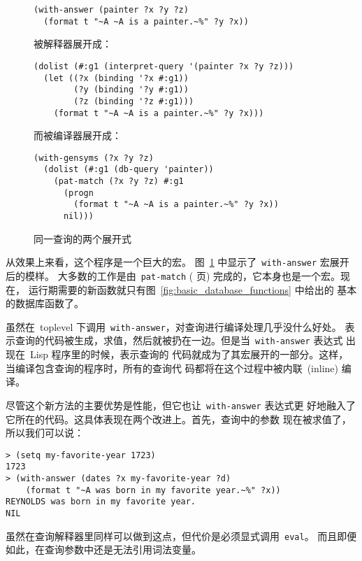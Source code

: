 \begin{figure}
\begin{lstlisting}
(with-answer (painter ?x ?y ?z)
  (format t "~A ~A is a painter.~%" ?y ?x))
\end{lstlisting}
被解释器展开成：
\begin{lstlisting}
(dolist (#:g1 (interpret-query '(painter ?x ?y ?z)))
  (let ((?x (binding '?x #:g1))
        (?y (binding '?y #:g1))
        (?z (binding '?z #:g1)))
    (format t "~A ~A is a painter.~%" ?y ?x)))
\end{lstlisting}
而被编译器展开成：
\begin{lstlisting}
(with-gensyms (?x ?y ?z)
  (dolist (#:g1 (db-query 'painter))
    (pat-match (?x ?y ?z) #:g1
      (progn
        (format t "~A ~A is a painter.~%" ?y ?x))
      nil)))
\end{lstlisting}
  \caption{同一查询的两个展开式}
  \label{fig:two_expansions_of_the_same_query}
\end{figure}

从效果上来看，这个程序是一个巨大的宏。
图~\ref{fig:two_expansions_of_the_same_query} 中显示了~\texttt{with-answer} 宏展开后的模样。
大多数的工作是由~\texttt{pat-match}
(\pageref{fig:fast_matching_operator} 页) 完成的，它本身也是一个宏。现在，
运行期需要的新函数就只有图~\ref{fig:basic_database_functions} 中给出的
基本的数据库函数了。

虽然在~toplevel 下调用~\texttt{with-answer}，对查询进行编译处理几乎没什么好处。
表示查询的代码被生成，求值，然后就被扔在一边。但是当~\texttt{with-answer} 表达式
出现在~Lisp 程序里的时候，表示查询的
代码就成为了其宏展开的一部分。这样，当编译包含查询的程序时，所有的查询代
码都将在这个过程中被内联~(inline) 编译。

尽管这个新方法的主要优势是性能，但它也让~\verb|with-answer| 表达式更
好地融入了它所在的代码。这具体表现在两个改进上。首先，查询中的参数
现在被求值了，所以我们可以说：
\begin{lstlisting}
> (setq my-favorite-year 1723)
1723
> (with-answer (dates ?x my-favorite-year ?d)
    (format t "~A was born in my favorite year.~%" ?x))
REYNOLDS was born in my favorite year.
NIL
\end{lstlisting}
虽然在查询解释器里同样可以做到这点，但代价是必须显式调用~\texttt{eval}。
而且即便如此，在查询参数中还是无法引用词法变量。


